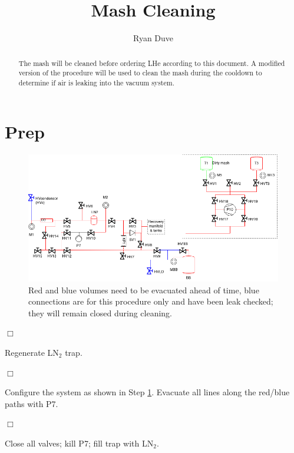 \documentclass[a4paper,10pt]{article}
\title{Mash Cleaning}
\author{Ryan Duve}
\newenvironment{checklist}{%
  \small
  \begin{list}{}{}%
  
  \setlength{\itemsep}{1pt}
  \setlength{\parskip}{0pt}
  \setlength{\parsep}{0pt}
  
  \let\olditem\item
  \renewcommand\item{{\olditem $\Box$} }
}{%
  \end{list}
}
\begin{document}
\maketitle

\begin{abstract}
\vspace{.1cm}
\vspace{.1cm}

The mash will be cleaned before ordering LHe according to this document.  A modified version of the procedure will be used to clean the mash during the cooldown to determine if air is leaking into the vacuum system.

\end{abstract}

\section{Prep}
\begin{figure}[htbp!]
 \centering
 \includegraphics[width=\textwidth]{./mash-cleaning-01.png}
 \caption{Red and blue volumes need to be evacuated ahead of time, blue connections are for this procedure only and have been leak checked; they will remain closed during cleaning.}
 \label{a}
\end{figure}

\begin{checklist}
 \item Regenerate LN$_2$ trap.
 \item Configure the system as shown in Step \ref{a}. Evacuate all lines along the red/blue paths with P7.
 \item Close all valves; kill P7; fill trap with LN$_2$.
\end{checklist}
\pagebreak
\end{document}

